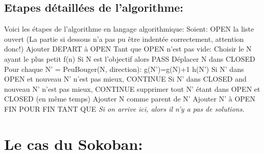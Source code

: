 \documentclass{article}
\begin{document}
\subsection{Etapes détaillées de l'algorithme:}
Voici les étapes de l'algorithme en langage algorithmique: \newline
Soient: OPEN la liste ouvert \newline
(La partie si dessous n'a pas pu être indentée correctement, attention donc!)
Ajouter DEPART à OPEN \newline
Tant que OPEN n'est pas vide:\newline
	Choisir le N ayant le plus petit f(n)\newline
	Si N est l'objectif alors PASS\newline
	Déplacer N dans CLOSED\newline
	Pour chaque N' = PeuBouger(N, direction):\newline
		g(N')=g(N)+1\newline
		h(N')\newline
		Si N' dans OPEN et nouveau N' n'est pas mieux, CONTINUE\newline
		Si N' dans CLOSED and nouveau N' n'est pas mieux, CONTINUE\newline
		supprimer tout N' étant dans OPEN et CLOSED (en même temps)\newline
		Ajouter N comme parent de N'\newline
		Ajouter N' à OPEN\newline
	FIN POUR\newline
FIN TANT QUE\newline
\textit{Si on arrive ici, alors il n'y a pas de solutions.}
			
\section{Le cas du Sokoban:}
\end{document}
